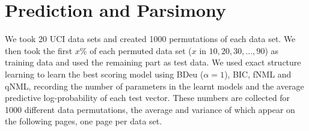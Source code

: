 \section{Prediction and Parsimony}

We took 20 UCI data sets and created 1000 permutations of each data set.
We then took the first $x$\% of each permuted data set ($x$ in
${10,20,30,\ldots,90}$) as training data and used the remaining part as
test data. We used exact structure learning to learn the best
scoring model using BDeu ($\alpha=1$), BIC, fNML and qNML,
recording the number of parameters in the learnt
models and the average predictive log-probability of each test
vector. These numbers are collected for 1000 different data
permutations, the average and variance of which appear on the following
pages, one page per data set.


